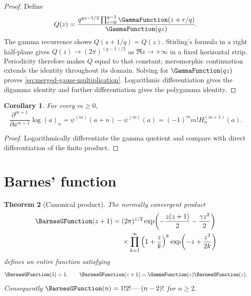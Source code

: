 \documentclass[11pt,a4paper,oneside,openany]{book}
\newtheorem{theorem}{Theorem}[chapter]
\newtheorem{corollary}[theorem]{Corollary}
\theoremstyle{definition}
\theoremstyle{remark}
\begin{document}
\begin{proof}
Define
\[
 Q(z)=\frac{q^{qz-1/2}\prod_{r=0}^{q-1}\GammaFunction(z+r/q)}{\GammaFunction(qz)}.
\]
The gamma recurrence shows $Q(z+1/q)=Q(z)$.  Stirling's formula in a right
half-plane gives $Q(z)\to(2\pi)^{(q-1)/2}$ as $\Re z\to+\infty$ in a fixed
horizontal strip.  Periodicity therefore makes $Q$ equal to that constant;
meromorphic continuation extends the identity throughout its domain.  Solving
for $\GammaFunction(qz)$ proves \eqref{eq:merged-gauss-multiplication}.  Logarithmic
differentiation gives the digamma identity and further differentiation gives
the polygamma identity.
\end{proof}

\begin{corollary}
For every $m\geq0$,
\begin{equation}
 \frac{\partial^{m+1}}{\partial a^{m+1}}\log(a)_n
 =\psi^{(m)}(a+n)-\psi^{(m)}(a)
 =(-1)^m m!H_n^{(m+1)}(a).                                        \label{eq:merged-pochhammer-polygamma}
\end{equation}
\end{corollary}

\begin{proof}
Logarithmically differentiate the gamma quotient and compare with direct
differentiation of the finite product.
\end{proof}

\section{Barnes' function}

\begin{theorem}[Canonical product]
\label{thm:merged-barnes-product}
The normally convergent product
\begin{align}
 \BarnesGFunction(z+1)={}&(2\pi)^{z/2}
 \exp\!\left(-\frac{z(z+1)}2-\frac{\gamma z^2}{2}\right)             \notag\\
 &\times\prod_{k=1}^{\infty}\left(1+\frac zk\right)^k
 \exp\!\left(-z+\frac{z^2}{2k}\right)                             \label{eq:merged-barnes-product}
\end{align}
defines an entire function satisfying
\begin{equation}
 \BarnesGFunction(1)=1,\qquad \BarnesGFunction(z+1)=\GammaFunction(z)\BarnesGFunction(z).                                \label{eq:merged-barnes-recurrence}
\end{equation}
Consequently $\BarnesGFunction(n)=1!2!\cdots(n-2)!$ for $n\geq2$.
\end{theorem}
\end{document}
